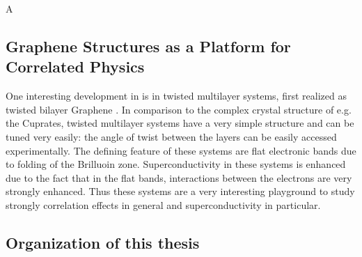 \documentclass[../notes.tex]{subfiles}
\begin{document}
A 

\subsection*{Graphene Structures as a Platform for Correlated Physics}

One interesting development in is in twisted multilayer systems, first realized as twisted bilayer Graphene \cite{caoUnconventionalSuperconductivityMagicangle2018}.
In comparison to the complex crystal structure of e.g. the Cuprates, twisted multilayer systems have a very simple structure and can be tuned very easily: the angle of twist between the layers can be easily accessed experimentally.
The defining feature of these systems are flat electronic bands due to folding of the Brilluoin zone.
Superconductivity in these systems is enhanced due to the fact that in the flat bands, interactions between the electrons are very strongly enhanced.
Thus these systems are a very interesting playground to study strongly correlation effects in general and superconductivity in particular.

\subsection*{Organization of this thesis}
\end{document}
